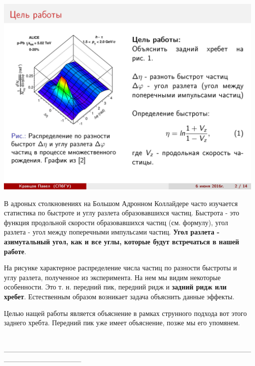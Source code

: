 \documentclass[14pt]{article}
\renewcommand{\line}{\\ \_\_\_\_\_\_\_\_\_\_\_\_\_\_\_\_\_\_\_\_\_\_\_\_\_\_\_\_\_\_\_\_\_\_\_\_\_\_\_\_\_\_\_\_\_\_\_\_\_\_\_\_\_\_\_\_\_\_\_\_\_\_\_ \\ }
\begin{document}
\begin{minipage}[h]{0.35\linewidth}
\includegraphics[width=1\linewidth]{page-02.jpg}
\end{minipage}
\begin{minipage}[h]{0.60\linewidth}
В адроных столкновениях на Большом Адронном Коллайдере часто изучается статистика по быстроте и  углу разлета образовавшихся частиц. Быстрота - это функция продольной скорости образовавшихся частиц (см. формулу), угол разлета - угол между поперечными импульсами частиц. {\bf Угол разлета - азимутальный угол, как и все углы, которые будут встречаться в нашей работе}. 

На рисунке характерное распределение числа частиц по разности быстроты и углу разлета, полученное из эксперимента. На нем мы видим некоторые особенности. Это т. н. передний пик, передний ридж и {\bfseries задний ридж или хребет}. Естественным образом возникает задача объяснить данные эффекты.

Целью нащей работы является объяснение в рамках струнного подхода вот этого заднего хребта. Передний пик уже имеет объяснение, позже мы его упомянем.
\end{minipage}
\line
\end{document}
